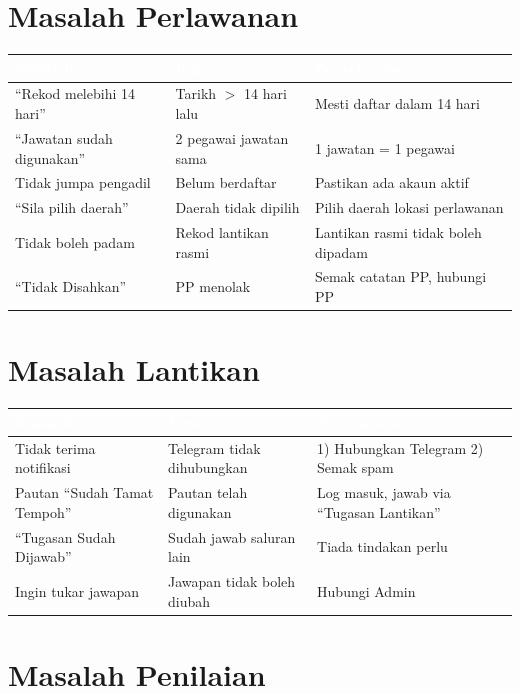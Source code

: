 \documentclass[12pt,a4paper]{report}
\begin{document}
\section{Masalah Perlawanan}

\begin{longtable}{L{4cm} L{3.5cm} L{6.5cm}}
\toprule
{}
\textcolor{white}{\textbf{Masalah}} & \textcolor{white}{\textbf{Punca}} & \textcolor{white}{\textbf{Penyelesaian}} \\
\midrule
\endhead
{}
``Rekod melebihi 14 hari'' & Tarikh $>$ 14 hari lalu & Mesti daftar dalam 14 hari \\
``Jawatan sudah digunakan'' & 2 pegawai jawatan sama & 1 jawatan = 1 pegawai \\
Tidak jumpa pengadil & Belum berdaftar & Pastikan ada akaun aktif \\
``Sila pilih daerah'' & Daerah tidak dipilih & Pilih daerah lokasi perlawanan \\
Tidak boleh padam & Rekod lantikan rasmi & Lantikan rasmi tidak boleh dipadam \\
``Tidak Disahkan'' & PP menolak & Semak catatan PP, hubungi PP \\
\bottomrule
\end{longtable}

\section{Masalah Lantikan}

\begin{longtable}{L{4cm} L{3.5cm} L{6.5cm}}
\toprule
{}
\textcolor{white}{\textbf{Masalah}} & \textcolor{white}{\textbf{Punca}} & \textcolor{white}{\textbf{Penyelesaian}} \\
\midrule
\endhead
{}
Tidak terima notifikasi & Telegram tidak dihubungkan & 1) Hubungkan Telegram 2) Semak spam \\
Pautan ``Sudah Tamat Tempoh'' & Pautan telah digunakan & Log masuk, jawab via ``Tugasan Lantikan'' \\
``Tugasan Sudah Dijawab'' & Sudah jawab saluran lain & Tiada tindakan perlu \\
Ingin tukar jawapan & Jawapan tidak boleh diubah & Hubungi Admin \\
\bottomrule
\end{longtable}

\section{Masalah Penilaian}
\end{document}
